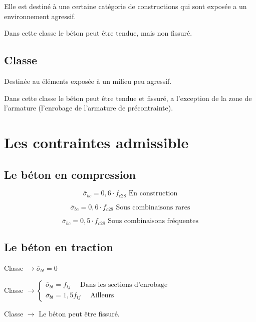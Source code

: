 \documentclass[12pt,a4paper]{article}
\newcommand{\RomanNum}[1] %
{\MakeUppercase{\romannumeral #1}}
\begin{document}
	Elle est destiné à une certaine catégorie de constructions qui sont exposée a un environnement agressif.
	
	Dans cette classe le béton peut être tendue, mais non fissuré.
	
	\subsection{Classe \RomanNum{3}}
	
	Destinée au éléments exposée à un milieu peu agressif.
	
	Dans cette classe le béton peut être tendue et fissuré, a l'exception de la zone de l'armature (l'enrobage de l'armature de précontrainte).
	
	
	\section{Les contraintes admissible}
	
	\subsection{Le béton en compression}
	
	\[ \overline{\sigma}_{bc} = 0,6 \cdot f_{c28} \text{ En construction} \]
	
	\[ \overline{\sigma}_{bc} = 0,6 \cdot f_{c28} \text{ Sous combinaisons rares} \]
	
	\[ \overline{\sigma}_{bc} = 0,5 \cdot f_{c28} \text{ Sous combinaisons fréquentes} \]
	
	
	\subsection{Le béton en traction}
	
	{\centering Classe \RomanNum{1} $\rightarrow \overline{\sigma}_{bt} = 0$ \par}
	
	\vspace{\baselineskip}
	
	{\centering \hspace{4cm} Classe \RomanNum{2} $\rightarrow \begin{cases}
			\overline{\sigma}_{bt} = f_{tj} \quad\text{ Dans les sections d'enrobage}\\
			\overline{\sigma}_{bt} = 1,5f_{tj} \quad\text{ Ailleurs}
		\end{cases}$ \par}
	
	\vspace{\baselineskip}
	
	{\centering Classe \RomanNum{3} $\rightarrow$ Le béton peut être fissuré. \par}
	
	
	
	
	
	
	
	
	
	
	
	
	
	
	
	
	
	
	
	
	
	
	
	
	
	
	
	
	
	
	
	
	
	
	
	
	
\end{document}
